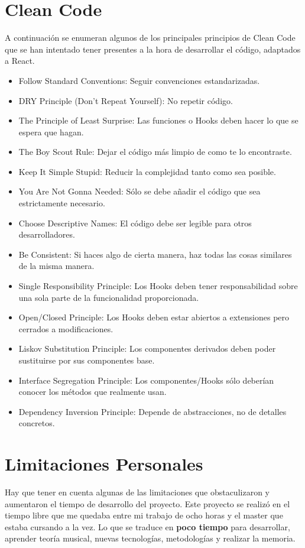 \documentclass[12pt,twoside,titlepage]{report}
\begin{document}
\chapter{Clean Code}
\label{sec:cleancode}
A continuación se enumeran algunos de los principales principios de Clean Code que se han intentado tener presentes a la hora de desarrollar el código, adaptados a React.
\begin{itemize}
    \item Follow Standard Conventions: Seguir convenciones estandarizadas.
    \item DRY Principle (Don't Repeat Yourself): No repetir código.
    \item The Principle of Least Surprise: Las funciones o Hooks deben hacer lo que se espera que hagan.
    \item The Boy Scout Rule: Dejar el código más limpio de como te lo encontraste.
    \item Keep It Simple Stupid: Reducir la complejidad tanto como sea posible.
    \item You Are Not Gonna Needed: Sólo se debe añadir el código que sea estrictamente necesario.
    \item Choose Descriptive Names: El código debe ser legible para otros desarrolladores.
    \item Be Consistent: Si haces algo de cierta manera, haz todas las cosas similares de la misma manera.
    \item Single Responsibility Principle: Los Hooks deben tener responsabilidad sobre una sola parte de la funcionalidad proporcionada.
    \item Open/Closed Principle: Los Hooks deben estar abiertos a extensiones pero cerrados a modificaciones.
    \item Liskov Substitution Principle: Los componentes derivados deben poder sustituirse por sus componentes base.
    \item Interface Segregation Principle: Los componentes/Hooks sólo deberían conocer los métodos que realmente usan.
    \item Dependency Inversion Principle: Depende de abstracciones, no de detalles concretos.
\end{itemize}

\chapter{Limitaciones Personales}

Hay que tener en cuenta algunas de las limitaciones que obstaculizaron y aumentaron el tiempo de desarrollo del proyecto. Este proyecto se realizó en el tiempo libre que me quedaba entre mi trabajo de ocho horas y el master que estaba cursando a la vez. Lo que se traduce en \textbf{poco tiempo} para desarrollar, aprender teoría musical, nuevas tecnologías, metodologías y realizar la memoria. 
\end{document}
